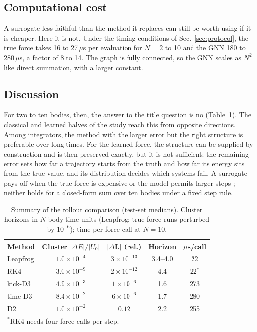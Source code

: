\documentclass[a4paper,journal]{IEEEtran}
\newcommand{\vect}[1]{\mathbf{#1}}
\begin{document}
\subsection{Computational cost}\label{sec:cost}

A surrogate less faithful than the method it replaces can still be worth using if it is cheaper. Here it is not. Under the timing conditions of Sec.~\ref{sec:protocol}, the true force takes 16 to 27\,$\mu$s per evaluation for $N=2$ to 10 and the GNN 180 to 280\,$\mu$s, a factor of 8 to 14. The graph is fully connected, so the GNN scales as $N^2$ like direct summation, with a larger constant.

\subsection{Discussion}\label{sec:answer}

For two to ten bodies, then, the answer to the title question is no (Table~\ref{tab:unified}). The classical and learned halves of the study reach this from opposite directions. Among integrators, the method with the larger error but the right structure is preferable over long times. For the learned force, the structure can be supplied by construction and is then preserved exactly, but it is not sufficient: the remaining error sets how far a trajectory starts from the truth and how far its energy sits from the true value, and its distribution decides which systems fail. A surrogate pays off when the true force is expensive or the model permits larger steps \cite{SanchezGonzalez2020,Cranmer2020,Breen2020}; neither holds for a closed-form sum over ten bodies under a fixed step rule.

\begin{table}[H]
\caption{Summary of the rollout comparison (test-set medians). Cluster horizons in $N$-body time units (Leapfrog: true-force runs perturbed by $10^{-6}$); time per force call at $N=10$.}
\label{tab:unified}
\centering
\footnotesize
\setlength{\tabcolsep}{3.5pt}
\begin{tabular}{lcccc}
\toprule
Method & Cluster $|\Delta E|/|U_0|$ & $|\Delta\vect L|$ (rel.) & Horizon & $\mu$s/call\\
\midrule
Leapfrog & $1.0{\times}10^{-4}$ & $3{\times}10^{-13}$ & 3.4--4.0 & 22\\
RK4 & $3.0{\times}10^{-9}$ & $2{\times}10^{-12}$ & 4.4 & 22$^{\ast}$\\
kick-D3 & $4.9{\times}10^{-3}$ & $1{\times}10^{-6}$ & 1.6 & 273\\
time-D3 & $8.4{\times}10^{-2}$ & $6{\times}10^{-6}$ & 1.7 & 280\\
D2 & $1.0{\times}10^{-2}$ & $0.12$ & 2.2 & 255\\
\bottomrule
\multicolumn{5}{l}{\scriptsize $^{\ast}$RK4 needs four force calls per step.}
\end{tabular}
\end{table}
\end{document}
